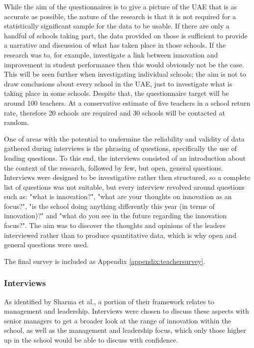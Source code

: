While the aim of the questionnaires is to give a picture of the UAE that is as accurate as possible, the nature of the research is that it is not required for a statistically significant sample for the data to be usable. If there are only a handful of schools taking part, the data provided on those is sufficient to provide a narrative and discussion of what has taken place in those schools. If the research was to, for example, investigate a link between innovation and improvement in student performance then this would obviously not be the case. This will be seen further when investigating individual schools; the aim is not to draw conclusions about every school in the UAE, just to investigate what is taking place in some schools.
Despite that, the questionnaire target will be around 100 teachers. At a conservative estimate of five teachers in a school return rate, therefore 20 schools are required and 30 schools will be contacted at random.

One of areas with the potential to undermine the reliability and validity of data gathered during interviews is the phrasing of questions, specifically the use of leading questions. To this end, the interviews consisted of an introduction about the context of the research, followed by few, but open, general questions. Interviews were designed to be investigative rather then structured, so a complete list of questions was not suitable, but every interview revolved around questions such as: "what is innovation?", "what are your thoughts on innovation as an focus?", "is the school doing anything differently this year (in terms of innovation)?" and "what do you see in the future regarding the innovation focus?". The aim was to discover the thoughts and opinions of the leaders interviewed rather than to produce quantitative data, which is why open and general questions were used. 

The final survey is included as Appendix \ref{appendix:teachersurvey}.

\subsubsection{Interviews}
As identified by Sharma et al., a portion of their framework relates to management and leadership. Interviews were chosen to discuss these aspects with senior managers to get a broader look at the range of innovation within the school, as well as the management and leadership focus, which only those higher up in the school would be able to discuss with confidence.

